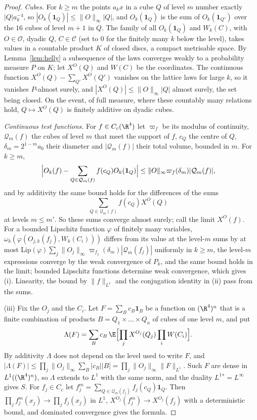 \begin{proof}
\emph{Cubes.} For $k\ge m$ the points $a_kx$ in a cube $Q$ of level $m$
number exactly $|Q|a_k^{-4}$, so $|O_k(\mathbf 1_Q)|\le\|O\|_\infty|Q|$, and
$O_k(\mathbf 1_Q)$ is the sum of $O_k(\mathbf 1_{Q'})$ over the $16$ cubes of
level $m+1$ in $Q$. The family of all $O_k(\mathbf 1_Q)$ and $W_k(C)$, with
$O\in\mathcal O$, dyadic $Q$, $C\in\mathcal C$ (set to $0$ for the finitely
many $k$ below the level), takes values in a countable product $K$ of closed
discs, a compact metrisable space. By Lemma~\ref{lem:helly} a subsequence
of the laws converges weakly to a probability measure $P$ on $K$; let
$X^O(Q)$ and $W(C)$ be the coordinates. The continuous function
$X^O(Q)-\sum_{Q'}X^O(Q')$ vanishes on the lattice laws for large $k$, so it
vanishes $P$-almost surely, and $|X^O(Q)|\le\|O\|_\infty|Q|$ almost surely,
the set being closed. On the event, of full measure, where these countably
many relations hold, $Q\mapsto X^O(Q)$ is finitely additive on dyadic cubes.

\emph{Continuous test functions.} For $f\in C_c(\R^4)$ let $\varpi_f$ be its
modulus of continuity, $\mathcal Q_m(f)$ the cubes of level $m$ that meet the
support of $f$, $c_Q$ the centre of $Q$, $\delta_m=2^{1-m}a_0$ their
diameter and $|\mathcal Q_m(f)|$ their total volume, bounded in $m$. For
$k\ge m$,
\[
\Bigl|O_k(f)-\sum_{Q\in\mathcal Q_m(f)}f(c_Q)O_k(\mathbf 1_Q)\Bigr|\le
\|O\|_\infty\varpi_f(\delta_m)|\mathcal Q_m(f)| ,
\]
and by additivity the same bound holds for the differences of the sums
\[\sum_{Q\in\mathcal Q_m(f)}f(c_Q)X^O(Q)\]
at levels $m\le m'$. So these sums
converge almost surely; call the limit $X^O(f)$. For a bounded Lipschitz
function $\varphi$ of finitely many variables, $\omega_k(\varphi(O_{j,k}(f_j),
W_k(C_i)))$ differs from its value at the level-$m$ sums by at most
$\mathrm{Lip}(\varphi)\sum_j\|O_j\|_\infty\varpi_{f_j}(\delta_m)|\mathcal
Q_m(f_j)|$ uniformly in $k\ge m$, the level-$m$ expressions converge by the
weak convergence of $P_k$, and the same bound holds in the limit; bounded
Lipschitz functions determine weak convergence, which gives (i). Linearity,
the bound by $\|f\|_{L^1}$ and the conjugation identity in (ii) pass from the
sums.

(iii) Fix the $O_j$ and the $C_i$. Let $F=\sum_Bc_B\mathbf 1_B$ be a function
on $(\R^4)^n$ that is a finite combination of products $B=Q_1\times\dots
\times Q_n$ of cubes of one level $m$, and put
\[
\Lambda(F)=\sum_Bc_B\,\E\Bigl[\prod_jX^{O_j}(Q_j)\prod_iW(C_i)\Bigr].
\]
By additivity $\Lambda$ does not depend on the level used to write $F$, and
$|\Lambda(F)|\le\prod_j\|O_j\|_\infty\sum_B|c_B||B|=\prod_j\|O_j\|_\infty
\|F\|_{L^1}$. Such $F$ are dense in $L^1((\R^4)^n)$, so $\Lambda$ extends to
$L^1$ with the same norm, and the duality $L^1{}^*=L^\infty$ gives $S$. For
$f_j\in C_c$ let $f^m_j=\sum_{Q\in\mathcal Q_m(f_j)}f_j(c_Q)\mathbf 1_Q$. Then
$\prod_jf^m_j(x_j)\to\prod_jf_j(x_j)$ in $L^1$, $X^{O_j}(f^m_j)\to X^{O_j}(f_j)$
with a deterministic bound, and dominated convergence gives the formula.


\end{proof}
